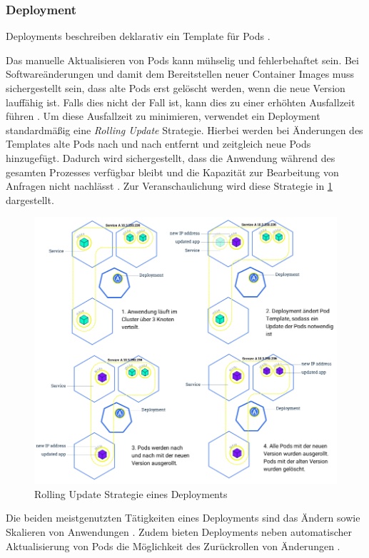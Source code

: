 \subsubsection{Deployment}
\label{subsec:kubernetes:deployment}
Deployments beschreiben deklarativ ein Template für Pods \cite{kubernetesDeployments}. 

Das manuelle Aktualisieren von Pods kann mühselig und fehlerbehaftet sein. Bei Softwareänderungen und damit dem
Bereitstellen neuer Container Images muss sichergestellt sein, dass alte Pods erst gelöscht werden, wenn die neue Version
lauffähig ist. Falls dies nicht der Fall ist, kann dies zu einer erhöhten Ausfallzeit führen \cite{Marko2018}.
Um diese Ausfallzeit zu minimieren, verwendet ein Deployment standardmäßig eine \emph{Rolling Update} Strategie.
Hierbei werden bei Änderungen des Templates alte Pods nach und nach entfernt und zeitgleich neue Pods hinzugefügt.
Dadurch wird sichergestellt, dass die Anwendung während des gesamten Prozesses verfügbar bleibt und die Kapazität zur Bearbeitung
von Anfragen nicht nachlässt \cite{Marko2018}.
Zur Veranschaulichung wird diese Strategie in \ref{fig:kubernetes_rolling_update} dargestellt.

\begin{figure}
  \centering
  \includegraphics[width=\textwidth]{gfx/chapters/2_grundlagen/deployment_rollout.png}
  \caption{Rolling Update Strategie eines Deployments}
  \label{fig:kubernetes_rolling_update}
\end{figure}

Die beiden meistgenutzten Tätigkeiten eines Deployments sind das Ändern sowie Skalieren von Anwendungen \cite{Burns2019}.
Zudem bieten Deployments neben automatischer Aktualisierung von Pods die Möglichkeit des Zurückrollen von Änderungen \cite{kubernetesDeployments}.
